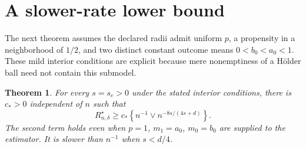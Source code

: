 \documentclass[11pt]{article}
\newtheorem{theorem}{Theorem}
\theoremstyle{definition}
\begin{document}
\section*{A slower-rate lower bound}
The next theorem assumes the declared radii admit uniform $p$, a propensity
in a neighborhood of $1/2$, and two distinct constant outcome means
$0<b_0<a_0<1$. These mild interior conditions are explicit because mere
nonemptiness of a H\"older ball need not contain this submodel.
\begin{theorem}
For every $s=s_e>0$ under the stated interior conditions, there is
$c_*>0$ independent of $n$ such that
\[
 R_{n,\delta}^{\star}\ge c_*\left\{n^{-1}
                      \mathbin{\vee} n^{-8s/(4s+d)}\right\}.       \tag{4}
\]
The second term holds even when $p=1$, $m_1=a_0$, $m_0=b_0$ are supplied
to the estimator. It is slower than $n^{-1}$ when $s<d/4$.
\end{theorem}
\end{document}
